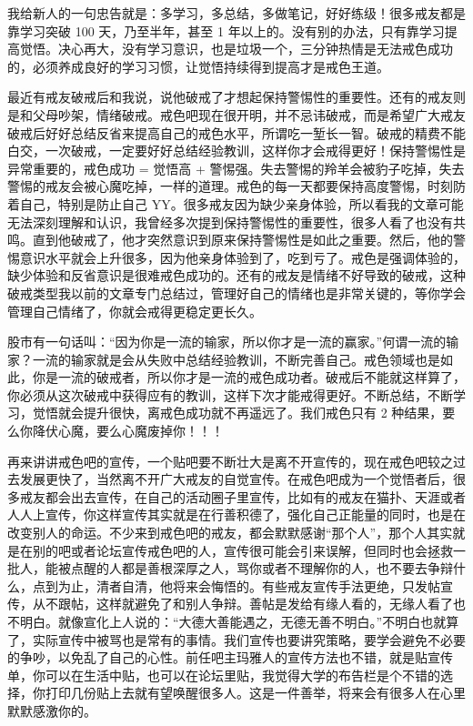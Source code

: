 \documentclass[fontset=founder]{ctexart}
\begin{document}
我给新人的一句忠告就是：多学习，多总结，多做笔记，好好练级！很多戒友都是靠学习突破 100 天，乃至半年，甚至 1 年以上的。没有别的办法，只有靠学习提高觉悟。决心再大，没有学习意识，也是垃圾一个，三分钟热情是无法戒色成功的，必须养成良好的学习习惯，让觉悟持续得到提高才是戒色王道。

最近有戒友破戒后和我说，说他破戒了才想起保持警惕性的重要性。还有的戒友则是和父母吵架，情绪破戒。戒色吧现在很开明，并不忌讳破戒，而是希望广大戒友破戒后好好总结反省来提高自己的戒色水平，所谓吃一堑长一智。破戒的精费不能白交，一次破戒，一定要好好总结经验教训，这样你才会戒得更好！保持警惕性是异常重要的，戒色成功 = 觉悟高 + 警惕强。失去警惕的羚羊会被豹子吃掉，失去警惕的戒友会被心魔吃掉，一样的道理。戒色的每一天都要保持高度警惕，时刻防着自己，特别是防止自己 YY。很多戒友因为缺少亲身体验，所以看我的文章可能无法深刻理解和认识，我曾经多次提到保持警惕性的重要性，很多人看了也没有共鸣。直到他破戒了，他才突然意识到原来保持警惕性是如此之重要。然后，他的警惕意识水平就会上升很多，因为他亲身体验到了，吃到亏了。戒色是强调体验的，缺少体验和反省意识是很难戒色成功的。还有的戒友是情绪不好导致的破戒，这种破戒类型我以前的文章专门总结过，管理好自己的情绪也是非常关键的，等你学会管理自己情绪了，你就会戒得更稳定更长久。

股市有一句话叫：“因为你是一流的输家，所以你才是一流的赢家。”何谓一流的输家？一流的输家就是会从失败中总结经验教训，不断完善自己。戒色领域也是如此，你是一流的破戒者，所以你才是一流的戒色成功者。破戒后不能就这样算了，你必须从这次破戒中获得应有的教训，这样下次才能戒得更好。不断总结，不断学习，觉悟就会提升很快，离戒色成功就不再遥远了。我们戒色只有 2 种结果，要么你降伏心魔，要么心魔废掉你！！！

再来讲讲戒色吧的宣传，一个贴吧要不断壮大是离不开宣传的，现在戒色吧较之过去发展更快了，当然离不开广大戒友的自觉宣传。在戒色吧成为一个觉悟者后，很多戒友都会出去宣传，在自己的活动圈子里宣传，比如有的戒友在猫扑、天涯或者人人上宣传，你这样宣传其实就是在行善积德了，强化自己正能量的同时，也是在改变别人的命运。不少来到戒色吧的戒友，都会默默感谢“那个人”，那个人其实就是在别的吧或者论坛宣传戒色吧的人，宣传很可能会引来误解，但同时也会拯救一批人，能被点醒的人都是善根深厚之人，骂你或者不理解你的人，也不要去争辩什么，点到为止，清者自清，他将来会悔悟的。有些戒友宣传手法更绝，只发帖宣传，从不跟帖，这样就避免了和别人争辩。善帖是发给有缘人看的，无缘人看了也不明白。就像宣化上人说的：“大德大善能遇之，无德无善不明白。”不明白也就算了，实际宣传中被骂也是常有的事情。我们宣传也要讲究策略，要学会避免不必要的争吵，以免乱了自己的心性。前任吧主玛雅人的宣传方法也不错，就是贴宣传单，你可以在生活中贴，也可以在论坛里贴，我觉得大学的布告栏是个不错的选择，你打印几份贴上去就有望唤醒很多人。这是一件善举，将来会有很多人在心里默默感激你的。
\end{document}
